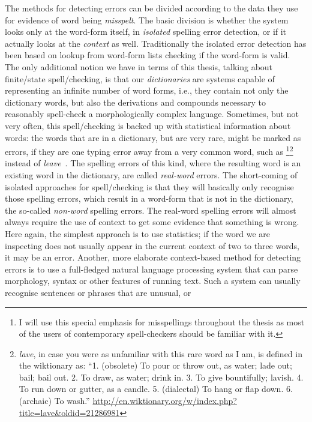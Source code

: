 \documentclass[officiallayout]{unihelcompling}
\newcommand\misspelt{\bgroup\markoverwith
{\textcolor{red}{\lower3.5pt\hbox{\sixly \char58}}}\ULon}
\begin{document}
The methods for detecting errors can be divided according to the data they use
for evidence of word being \emph{misspelt}. The basic division is whether the
system looks only at the word-form itself, in \emph{isolated} spelling error
detection, or if it actually looks at the \emph{context} as well. Traditionally
the isolated error detection has been based on lookup from word-form lists
checking if the word-form is valid. The only additional notion we have in terms
of this thesis, talking about finite\-/state spell\-/checking, is that our
\emph{dictionaries} are systems capable of representing an infinite number of
word forms, i.e., they contain not only the dictionary words, but also the
derivations and compounds necessary to reasonably spell-check a morphologically
complex language. Sometimes, but not very often, this spell\-/checking is backed
up with statistical information about words: the words that are in a
dictionary, but are very rare, might be marked as errors, if they are one
typing error away from a very common word, such as \misspelt{lave}\footnote{I
    will use this special emphasis for misspellings throughout the thesis as
    most of the users of contemporary spell-checkers should be familiar with
it.}\footnote{\emph{lave}, in case you were as unfamiliar with this rare word as I am, is defined in the wiktionary as: ``1. (obsolete) To pour or throw out,
    as water; lade out; bail; bail out. 2. To draw, as water; drink in. 3. 
    To give bountifully; lavish. 4. To run down or gutter, as a candle. 5.
    (dialectal) To hang or flap down. 6. (archaic) To wash.''
\url{http://en.wiktionary.org/w/index.php?title=lave&oldid=21286981}} instead
of \emph{leave}~\citep{kukich1992techniques}.  The spelling errors
of this kind, where the resulting word is an existing word in the dictionary,
are called \emph{real-word} errors.  The short-coming of isolated approaches
for spell\-/checking is that they will basically only recognise those spelling
errors, which result in a word-form that is not in the dictionary, the
so-called \emph{non-word} spelling errors. The real-word spelling errors will
almost always require the use of context to get some evidence that something is
wrong. Here again, the simplest approach is to use statistics; if the word
we are inspecting does not usually appear in the current context of two to
three words, it may be an error. Another, more elaborate context-based method
for detecting errors is to use a full-fledged natural language processing
system that can parse morphology, syntax or other features of running text.
Such a system can usually recognise sentences or phrases that are unusual, or
\end{document}
